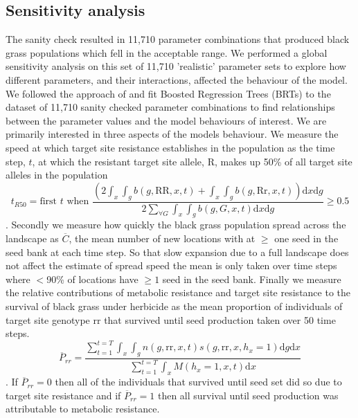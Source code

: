 \documentclass[12pt, a4paper]{article}
\begin{document}
\subsection{Sensitivity analysis}
The sanity check resulted in 11,710 parameter combinations that produced black grass populations which fell in the acceptable range. We performed a global sensitivity analysis on this set of 11,710 'realistic' parameter sets to explore how different parameters, and their interactions, affected the behaviour of the model. We followed the approach of \cite{Cout2014} and fit Boosted Regression Trees (BRTs) to the dataset of 11,710 sanity checked parameter combinations to find relationships between the parameter values and the model behaviours of interest. We are primarily interested in three aspects of the models behaviour. We measure the speed at which target site resistance establishes in the population as the time step, $t$, at which the resistant target site allele, R, makes up 50\% of all target site alleles in the population  
\begin{equation}\label{eq:t_R50}
	t_{R50} = \text{first } t \text{ when } \frac{\left(2\int_x\int_g b(g, \text{RR}, x, t) + \int_x\int_g b(g, \text{Rr}, x, t) \right)\text{d}x\text{d}g}{2\sum_{\forall G} \int_x\int_g b(g, G, x, t)\text{d}x\text{d}g} \geq 0.5
\end{equation}.    
Secondly we measure how quickly the black grass population spread across the landscape as $\overline{C}$, the mean number of new locations with at $\geq$ one seed in the seed bank at each time step. So that slow expansion due to a full landscape does not affect the estimate of spread speed the mean is only taken over time steps where $<$90\% of locations have $\geq 1$ seed in the seed bank. Finally we measure the relative contributions of metabolic resistance and target site resistance to the survival of black grass under herbicide as the mean proportion of individuals of target site genotype rr that survived until seed production taken over 50 time steps.  
\begin{equation}\label{eq:mean_pro_rr}
	\overline{P}_{rr} = \frac{\sum_{t=1}^{t=T}\int_x\int_g n(g, \text{rr}, x, t)s(g, \text{rr}, x, h_x = 1)\text{d}g\text{d}x}{\sum_{t=1}^{t=T}\int_x M(h_x = 1, x, t)\text{d}x}
\end{equation} .
If $\overline{P}_{rr} = 0$ then all of the individuals that survived until seed set did so due to target site resistance and if $\overline{P}_{rr} = 1$ then all survival until seed production was attributable to metabolic resistance.   
\end{document}
